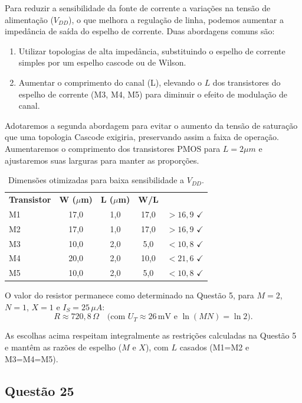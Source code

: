 ﻿\documentclass[12pt,a4paper]{article}
\begin{document}
Para reduzir a sensibilidade da fonte de corrente a variações na tensão de alimentação ($V_{DD}$), o que melhora a regulação de linha, podemos aumentar a impedância de saída do espelho de corrente. Duas abordagens comuns são:
\begin{enumerate}
    \item Utilizar topologias de alta impedância, substituindo o espelho de corrente simples por um espelho cascode ou de Wilson.
    \item Aumentar o comprimento do canal (L), elevando o $L$ dos transistores do espelho de corrente (M3, M4, M5) para diminuir o efeito de modulação de canal.
\end{enumerate}

Adotaremos a segunda abordagem para evitar o aumento da tensão de saturação que uma topologia Cascode exigiria, preservando assim a faixa de operação. Aumentaremos o comprimento dos transistores PMOS para $L=2\mu m$ e ajustaremos suas larguras para manter as proporções.

\begin{table}[H]
\centering
\caption{Dimensões otimizadas para baixa sensibilidade a $V_{DD}$.}
\label{tab:dimensoes_otimizadas}
\begin{tabular}{@{}lcccc@{}}
\toprule
\textbf{Transistor} & \textbf{W ($\mu$m)} & \textbf{L ($\mu$m)} & \textbf{W/L} \\
M1 & 17,0 & 1,0 & 17,0 & $> 16,9$ $\checkmark$ \\
M2 & 17,0 & 1,0 & 17,0 & $> 16,9$ $\checkmark$ \\
M3 & 10,0 & 2,0 & 5,0 & $< 10,8$ $\checkmark$ \\
M4 & 20,0 & 2,0 & 10,0 & $< 21,6$ $\checkmark$ \\
M5 & 10,0 & 2,0 & 5,0 & $< 10,8$ $\checkmark$ \\
\bottomrule
\bottomrule
\end{tabular}
\end{table}
O valor do resistor permanece como determinado na Questão 5, para $M=2$, $N=1$, $X=1$ e $I_S=25\,\mu A$:
$$ R \approx 720{,}8\,\Omega \quad \text{(com } U_T \approx 26\,\text{mV e }\ln(MN)=\ln 2\text{)}. $$

As escolhas acima respeitam integralmente as restrições calculadas na Questão 5 e mantêm as razões de espelho ($M$ e $X$), com $L$ casados (M1=M2 e M3=M4=M5).
\subsection*{Questão 25}
\end{document}
